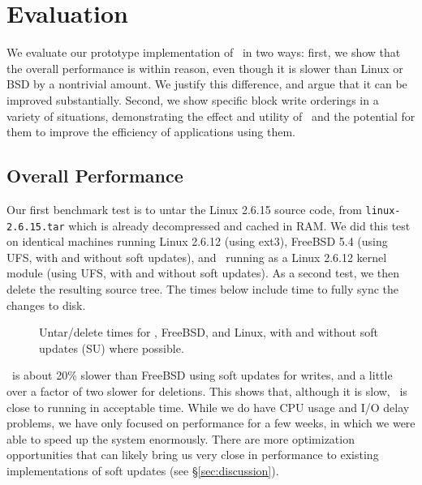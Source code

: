 \section {Evaluation}
\label{sec:evaluation}

We evaluate our prototype implementation of \Kudos\ in two ways: first, we
show that the overall performance is within reason, even though it is slower
than Linux or BSD by a nontrivial amount. We justify this difference, and argue
that it can be improved substantially. Second, we show specific block write
orderings in a variety of situations, demonstrating the effect and utility of
\opgroups\ and the potential for them to improve the efficiency of applications
using them.

\subsection {Overall Performance}

Our first benchmark test is to untar the Linux 2.6.15 source code, from
\texttt{linux-2.6.15.tar} which is already decompressed and cached in RAM. We
did this test on identical machines running Linux 2.6.12 (using ext3), FreeBSD
5.4 (using UFS, with and without soft updates), and \Kudos\ running as a Linux
2.6.12 kernel module (using UFS, with and without soft updates). As a second
test, we then delete the resulting source tree. The times below include time to
fully sync the changes to disk.

\begin{figure}[htb]
\caption{\label{fig:macro} Untar/delete times for \Kudos, FreeBSD, and Linux,
with and without soft updates (SU) where possible.}
\end{figure}

\Kudos\ is about 20\% slower than FreeBSD using soft updates for
writes, and a little over a factor of two slower for deletions. This
shows that, although it is slow, \Kudos\ is close to running in
acceptable time. While we do have CPU usage and I/O delay problems, we
have only focused on performance for a few weeks, in which we were
able to speed up the system enormously.  There are more optimization
opportunities that can likely bring us very close in performance to
existing implementations of soft updates (see \S\ref{sec:discussion}).

